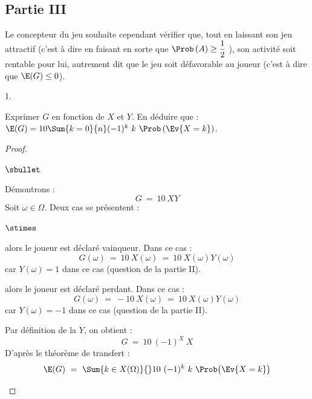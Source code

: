 \documentclass[11pt]{article}%
\begin{document}
\newpage


\subsection*{Partie III}

\noindent
Le concepteur du jeu souhaite cependant vérifier que, tout en laissant
son jeu attractif (c'est à dire en faisant en sorte que
$\Prob\left(A\right) \geq \dfrac12$ ), son activité soit rentable pour
lui, autrement dit que le jeu soit défavorable au joueur (c'est à dire
que $\E(G) \leq 0$).

\begin{noliste}{1.}
  \setlength{\itemsep}{4mm}
\item Exprimer $G$ en fonction de $X$ et $Y$. En déduire que : $\E(G)
  = 10 \Sum{k = 0}{n} (-1)^{k} \ k \ \Prob\left(\Ev{X = k}\right)$.

  \begin{proof}~%
    \begin{noliste}{$\sbullet$}
    \item Démontrons : 
      \[
      G \ = \ 10 \ XY
      \]
      Soit $\omega \in \Omega$. Deux cas se présentent :
      \begin{noliste}{$\stimes$}
      \item {} alors le joueur est
        déclaré vainqueur. Dans ce cas :
        \[
        G(\omega) \ = \ 10 \ X(\omega) \ = \ 10 \ X(\omega) Y(\omega) 
        \]
        car $Y(\omega) = 1$ dans ce cas (\cf question  de
        la partie II).

      \item {} alors le joueur est
        déclaré perdant. Dans ce cas :
        \[
        G(\omega) \ = \ -10 \ X(\omega) \ = \ 10 \ X(\omega) Y(\omega) 
        \]
        car $Y(\omega) = -1$ dans ce cas (\cf question  de
        la partie II).
      \end{noliste}

    \item Par définition de la \var $Y$, on obtient : 
      \[
      G \ = \ 10 \ (-1)^X \ X
      \]
      D'après le théorème de transfert :
      \[
      \E(G) \ = \ \Sum{k \in X(\Omega)}{} 10 \ (-1)^k \ k \ \Prob\big(
      \Ev{X = k} \big)
      \]
    \end{noliste}



\end{proof}
\end{noliste}
\end{document}
